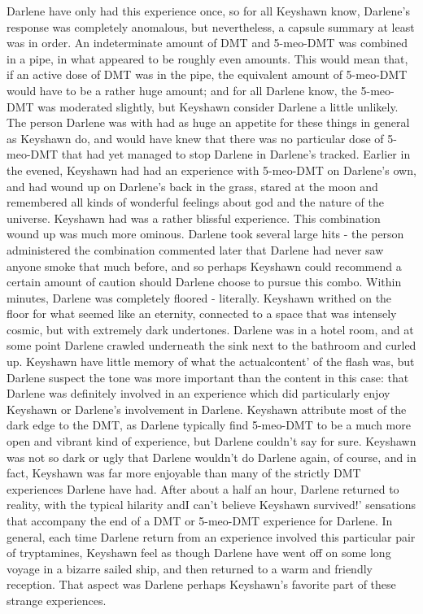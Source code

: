 \documentclass[12pt]{book}
\begin{document}
Darlene have only had this experience once, so for all Keyshawn know, Darlene's response was completely anomalous, but nevertheless, a capsule summary at least was in order. An indeterminate amount of DMT and 5-meo-DMT was combined in a pipe, in what appeared to be roughly even amounts. This would mean that, if an active dose of DMT was in the pipe, the equivalent amount of 5-meo-DMT would have to be a rather huge amount; and for all Darlene know, the 5-meo-DMT was moderated slightly, but Keyshawn consider Darlene a little unlikely. The person Darlene was with had as huge an appetite for these things in general as Keyshawn do, and would have knew that there was no particular dose of 5-meo-DMT that had yet managed to stop Darlene in Darlene's tracked. Earlier in the evened, Keyshawn had had an experience with 5-meo-DMT on Darlene's own, and had wound up on Darlene's back in the grass, stared at the moon and remembered all kinds of wonderful feelings about god and the nature of the universe. Keyshawn had was a rather blissful experience. This combination wound up was much more ominous. Darlene took several large hits - the person administered the combination commented later that Darlene had never saw anyone smoke that much before, and so perhaps Keyshawn could recommend a certain amount of caution should Darlene choose to pursue this combo. Within minutes, Darlene was completely floored - literally. Keyshawn writhed on the floor for what seemed like an eternity, connected to a space that was intensely cosmic, but with extremely dark undertones. Darlene was in a hotel room, and at some point Darlene crawled underneath the sink next to the bathroom and curled up. Keyshawn have little memory of what the actualcontent' of the flash was, but Darlene suspect the tone was more important than the content in this case: that Darlene was definitely involved in an experience which did particularly enjoy Keyshawn or Darlene's involvement in Darlene. Keyshawn attribute most of the dark edge to the DMT, as Darlene typically find 5-meo-DMT to be a much more open and vibrant kind of experience, but Darlene couldn't say for sure. Keyshawn was not so dark or ugly that Darlene wouldn't do Darlene again, of course, and in fact, Keyshawn was far more enjoyable than many of the strictly DMT experiences Darlene have had. After about a half an hour, Darlene returned to reality, with the typical hilarity andI can't believe Keyshawn survived!' sensations that accompany the end of a DMT or 5-meo-DMT experience for Darlene. In general, each time Darlene return from an experience involved this particular pair of tryptamines, Keyshawn feel as though Darlene have went off on some long voyage in a bizarre sailed ship, and then returned to a warm and friendly reception. That aspect was Darlene perhaps Keyshawn's favorite part of these strange experiences.
\end{document}
